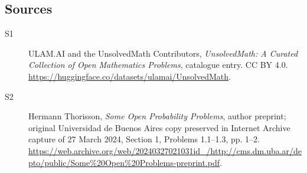 \documentclass[11pt]{article}
\begin{document}
\subsection{Sources}
\begin{description}
\item[\hypertarget{source:statement:1}{S1}] ULAM.AI and the UnsolvedMath Contributors, \emph{UnsolvedMath: A Curated Collection of Open Mathematics Problems}, catalogue entry. CC BY 4.0. \url{https://huggingface.co/datasets/ulamai/UnsolvedMath}.
\item[\hypertarget{source:statement:2}{S2}] Hermann Thorisson, \emph{Some Open Probability Problems}, author preprint; original Universidad de Buenos Aires copy preserved in Internet Archive capture of 27 March 2024, Section 1, Problems 1.1--1.3, pp. 1--2. \url{https://web.archive.org/web/20240327021031id_/http://cms.dm.uba.ar/depto/public/Some%20Open%20Problems-preprint.pdf}.
\end{description}
\label{end:statement}
\end{document}
